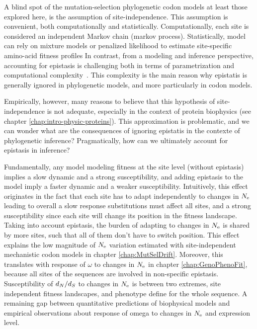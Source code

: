 A blind spot of the mutation-selection phylogenetic codon models at least those explored here, is the assumption of site-independence.
This assumption is convenient, both computationally and statistically.
Computationally, each site is considered an independent Markov chain (markov process).
Statistically, model can rely on mixture models or penalized likelihood to estimate site-specific amino-acid fitness profiles
In contrast, from a modeling and inference perspective, accounting for epistasis is challenging  both in terms of parametrization and computational complexity~\citep{Rodrigue2005, Manhart2014}.
This complexity is the main reason why epistatis is generally ignored in phylogenetic models, and more particularly in codon models.

Empirically, however, many reasons to believe that this hypothesis of site-independence is not adequate, especially in the context of protein biophysics (see chapter \ref{chap:intro-physic-proteins}).
This approximation is problematic, and we can wonder what are the consequences of ignoring epistatis in the contexte of phylogenetic inference?
Pragmatically, how can we ultimately account for epistasis in inference?

Fundamentally, any model modeling fitness at the site level (without epistasis) implies a slow dynamic and a strong susceptibility, and adding epistasis to the model imply a faster dynamic and a weaker susceptibility.
Intuitively, this effect originates in the fact that each site has to adapt independently to changes in $N_{\textrm{e}}$ leading to overall a slow response substitutions must affect all sites, and a strong susceptibility since each site will change its position in the fitness landscape.
Taking into account epistasis, the burden of adapting to changes in $N_{\textrm{e}}$ is shared by more sites, such that all of them don't have to switch position.
This effect explains the low magnitude of $N_{\textrm{e}}$ variation estimated with site-independent mechanistic codon models in chapter \ref{chap:MutSelDrift}.
Moreover, this translates with response of $\omega$ to changes in $N_{\textrm{e}}$ in chapter \ref{chap:GenoPhenoFit}, because all sites of the sequences are involved in non-specific epistasis.
Susceptibility of $d_N / d_S$ to changes in $N_{\textrm{e}}$ is between two extremes, site independent fitness landscapes, and phenotype define for the whole sequence.
A remaining gap between quantitative predictions of biophysical models and empirical observations about response of omega to changes in $N_{\textrm{e}}$ and expression level.

